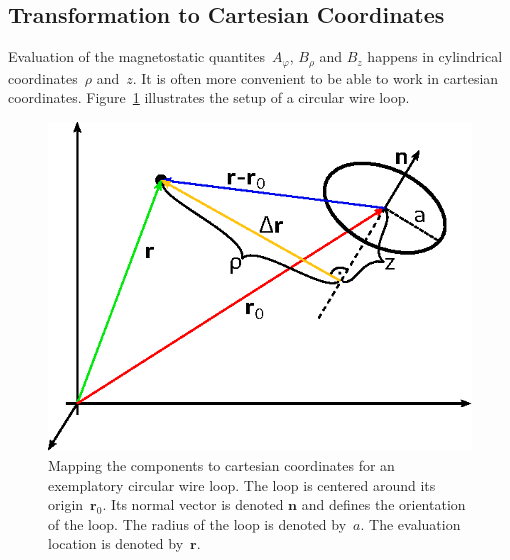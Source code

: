 \subsection{Transformation to Cartesian Coordinates}
Evaluation of the magnetostatic quantites~$A_\varphi$, $B_\rho$ and $B_z$ happens in cylindrical coordinates~$\rho$ and~$z$.
It is often more convenient to be able to work in cartesian coordinates.
Figure~\ref{fig:mappingToCartesian} illustrates the setup of a circular wire loop.
\begin{figure}[htbp]
 \centering
 \includegraphics{img/MappingToCartesian.eps}
 \caption{Mapping the components to cartesian coordinates for an exemplatory circular wire loop.
          The loop is centered around its origin~$\mathbf{r}_0$.
          Its normal vector is denoted $\mathbf{n}$ and defines the orientation of the loop.
          The radius of the loop is denoted by~$a$.
          The evaluation location is denoted by~$\mathbf{r}$.}
 \label{fig:mappingToCartesian}
\end{figure}

